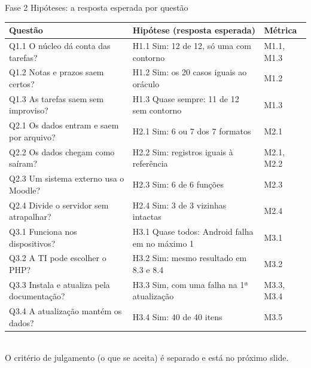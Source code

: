 \documentclass[aspectratio=169,10pt]{beamer}
\begin{document}

\begin{frame}{Fase 2 \textperiodcentered{} Hipóteses: a resposta esperada por questão}
\scriptsize
\begin{tabular}{@{}lll@{}}
\toprule
\textbf{Questão} & \textbf{Hipótese (resposta esperada)} & \textbf{Métrica} \\
\midrule
Q1.1 O núcleo dá conta das tarefas? & H1.1 Sim: 12 de 12, só uma com contorno & M1.1, M1.3 \\
Q1.2 Notas e prazos saem certos? & H1.2 Sim: os 20 casos iguais ao oráculo & M1.2 \\
Q1.3 As tarefas saem sem improviso? & H1.3 Quase sempre: 11 de 12 sem contorno & M1.3 \\
\midrule
Q2.1 Os dados entram e saem por arquivo? & H2.1 Sim: 6 ou 7 dos 7 formatos & M2.1 \\
Q2.2 Os dados chegam como saíram? & H2.2 Sim: registros iguais à referência & M2.1, M2.2 \\
Q2.3 Um sistema externo usa o Moodle? & H2.3 Sim: 6 de 6 funções & M2.3 \\
Q2.4 Divide o servidor sem atrapalhar? & H2.4 Sim: 3 de 3 vizinhas intactas & M2.4 \\
\midrule
Q3.1 Funciona nos dispositivos? & H3.1 Quase todos: Android falha em no máximo 1 & M3.1 \\
Q3.2 A TI pode escolher o PHP? & H3.2 Sim: mesmo resultado em 8.3 e 8.4 & M3.2 \\
Q3.3 Instala e atualiza pela documentação? & H3.3 Sim, com uma falha na 1ª atualização & M3.3, M3.4 \\
Q3.4 A atualização mantém os dados? & H3.4 Sim: 40 de 40 itens & M3.5 \\
\bottomrule
\end{tabular}\\[0.5em]
O critério de julgamento (o que se aceita) é separado e está no próximo slide.
\end{frame}
\end{document}
